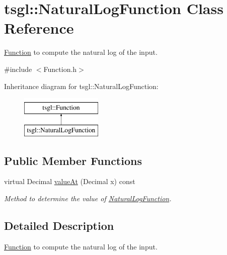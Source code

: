 \hypertarget{classtsgl_1_1_natural_log_function}{\section{tsgl\-:\-:Natural\-Log\-Function Class Reference}
\label{classtsgl_1_1_natural_log_function}
}


\hyperlink{classtsgl_1_1_function}{Function} to compute the natural log of the input.  




{\ttfamily \#include $<$Function.\-h$>$}

Inheritance diagram for tsgl\-:\-:Natural\-Log\-Function\-:\begin{figure}[H]
\begin{center}
\leavevmode
\includegraphics[height=2.000000cm]{classtsgl_1_1_natural_log_function}
\end{center}
\end{figure}
\subsection*{Public Member Functions}
\begin{DoxyCompactItemize}
\item 
virtual Decimal \hyperlink{classtsgl_1_1_natural_log_function_a21ce8c1cad8b13dccf9308c73a48df12}{value\-At} (Decimal x) const 
\begin{DoxyCompactList}\small\item\em Method to determine the value of \hyperlink{classtsgl_1_1_natural_log_function}{Natural\-Log\-Function}. \end{DoxyCompactList}\end{DoxyCompactItemize}


\subsection{Detailed Description}
\hyperlink{classtsgl_1_1_function}{Function} to compute the natural log of the input. 

